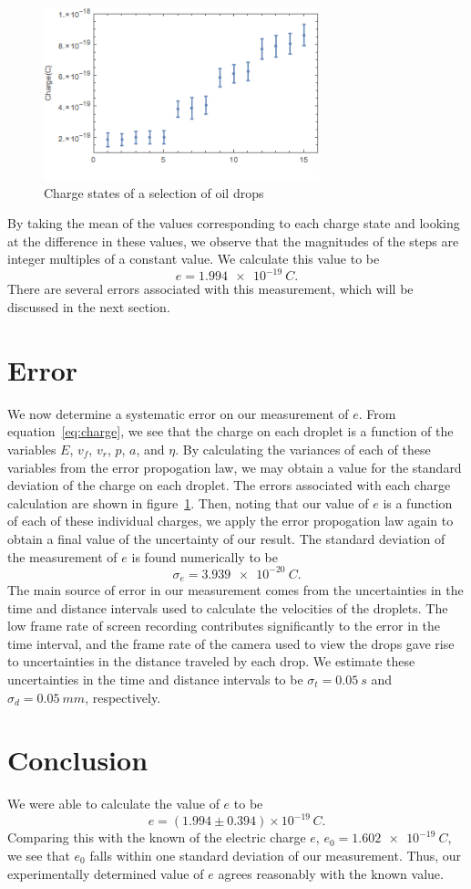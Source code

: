 \documentclass[aps, reprint,amsmath,amssymb]{revtex4-1} %
\begin{document}
\begin{figure}
\centering
\includegraphics[width=8cm]{errorBarPlot.png}
\caption{Charge states of a selection of oil drops}
\label{fig:chargeplot}
\end{figure}

By taking the mean of the values corresponding to each charge state and looking at the difference in these values, we observe that the magnitudes of the steps are integer multiples of a constant value. We calculate this value to be 
\[
    e = \SI{1.994e-19}{C}.
\]
There are several errors associated with this measurement, which will be
discussed in the next section.

\section{Error}
We now determine a systematic error on our measurement of $e$. From
equation~\eqref{eq:charge}, we see that the charge on each droplet is a function of the variables $E$, $v_f$, $v_r$, $p$, $a$, and $\eta$. By calculating the variances of each of these variables from the error propogation law, we may obtain a value for the standard deviation of the charge on each droplet. The errors associated with each charge calculation are shown in figure~\ref{fig:chargeplot}. Then, noting that our value of $e$ is a function of each of these individual charges, we apply the error propogation law again to obtain a final value of the uncertainty of our result. The standard deviation of the measurement of $e$ is found numerically to be
\[
    \sigma_e = \SI{3.939e-20}{C}.
\]
The main source of error in our measurement comes from the uncertainties in the time and distance intervals used to calculate the velocities of the droplets. The low frame rate of screen recording contributes significantly to the error in the time interval, and the frame rate of the camera used to view the drops gave rise to uncertainties in the distance traveled by each drop. We estimate these uncertainties in the time and distance intervals to be $\sigma_t = \SI{0.05}{s}$ and $\sigma_d = \SI{0.05}{mm}$, respectively.
\section{Conclusion}

We were able to calculate the value of $e$ to be
\[
    e = (1.994 \pm 0.394) \times 10^{-19} \,\si{C}.
\]
Comparing this with the known of the electric charge $e$, $e_0 = \SI{1.602e-19}{C}$, we
see that $e_0$ falls within one standard deviation of our measurement.
Thus, our experimentally determined value of $e$ agrees reasonably with the
known value.
\end{document}
